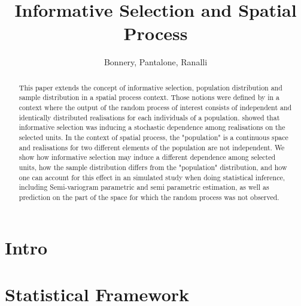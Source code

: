 \documentclass[12pt]{article}
\title{Informative Selection and Spatial Process}
\date{}
\author{Bonnery,  Pantalone, Ranalli}
\theoremstyle{definition}
\theoremstyle{remark}
\begin{document}
\maketitle

\tableofcontents

\begin{abstract}
This paper extends the concept of informative selection, population distribution and sample distribution in a spatial process context.
Those notions were defined by 
\cite{pfefferman_1992} in a context where the output of the random process of interest consists of independent and identically distributed realisations for each individuals of a population. \cite{BonneryBreidtCoquet} showed that informative selection was inducing a stochastic dependence among realisations on the selected units. In the context of spatial process, the "population" is a continuous space and realisations for two different elements of the population are not independent. We show how informative selection may induce a different dependence among selected units, how the sample distribution differs from the "population" distribution, and how one can  account for this effect in an simulated study when doing statistical inference, including Semi-variogram parametric and semi parametric estimation, as well as prediction on the part of the space for which the random process was not observed.
\end{abstract}

\section{Intro}


\section{Statistical Framework} \label{sec:stat_fra}
\end{document}
